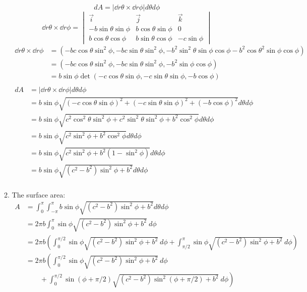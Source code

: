 \documentclass{X:/Documents/Coding/Latex/myassignment}
\begin{document}
\begin{enumerate}
\begin{enumerate}
	\[dA = \left|\dd r\theta \times \dd r\phi \right| d\theta d\phi\]
	\[\dd r\theta \times \dd r\phi= \begin{vmatrix}
		\vec i & \vec j & \vec k \\
		-b\sin\theta \sin\phi& b\cos\theta\sin\phi&0\\
		b\cos\theta\cos\phi& b\sin\theta\cos\phi&-c\sin\phi
	\end{vmatrix}\]
	\begin{align*}
		\dd r\theta \times \dd r\phi&= \left(-bc\cos\theta\sin^2\phi, -bc\sin\theta\sin^2\phi, -b^2\sin^2\theta\sin\phi\cos\phi - b^2\cos\theta^2\sin\phi\cos\phi\right)\\
		&=\left(-bc\cos\theta\sin^2\phi, -bc\sin\theta\sin^2\phi, -b^2\sin\phi\cos\phi\right) \\
		&= b\sin\phi \det \left(-c\cos\theta\sin\phi, -c\sin\theta\sin\phi, -b\cos\phi\right) \\
	\end{align*}
	\begin{align*}
	dA &= \left|\dd r\theta \times \dd r\phi \right| d\theta d\phi\\
		&= b\sin\phi\sqrt{(-c\cos\theta\sin\phi)^2 + (-c\sin\theta\sin\phi)^2 + (-b\cos\phi)^2} d\theta d\phi\\
		&= b\sin\phi\sqrt{c^2\cos^2\theta\sin^2\phi + c^2\sin^2\theta\sin^2\phi + b^2\cos^2\phi} d\theta d\phi\\
		&= b\sin\phi\sqrt{c^2\sin^2\phi + b^2\cos^2\phi} d\theta d\phi\\
		&= b\sin\phi\sqrt{c^2\sin^2\phi + b^2(1-\sin^2\phi)} d\theta d\phi\\
		&= b\sin\phi\sqrt{(c^2-b^2)\sin^2\phi + b^2} d\theta d\phi\\
	\end{align*}
	\item The surface area:
	\begin{align*}
		A &= \int_{0}^{\pi}\int_{-\pi}^{\pi} b\sin\phi\sqrt{(c^2-b^2)\sin^2\phi + b^2}d\theta d\phi\\
		&= 2\pi b  \int_{0}^{\pi} \sin\phi\sqrt{(c^2-b^2)\sin^2\phi + b^2} \ d\phi\\
		&= 2\pi b \left( \int_{0}^{\pi/2} \sin\phi\sqrt{(c^2-b^2)\sin^2\phi + b^2} \ d\phi +  \int_{\pi/2}^{\pi} \sin\phi\sqrt{(c^2-b^2)\sin^2\phi + b^2} \ d\phi\right)\\
		&= 2\pi b \left( \int_{0}^{\pi/2} \sin\phi\sqrt{(c^2-b^2)\sin^2\phi + b^2} \ d\phi \right.\\&\qquad+\left.  \int_{0}^{\pi/2} \sin(\phi+\pi/2)\sqrt{(c^2-b^2)\sin^2(\phi+\pi/2) + b^2} \ d\phi\right)\\

\end{align*}
\end{enumerate}
\end{enumerate}
\end{document}
